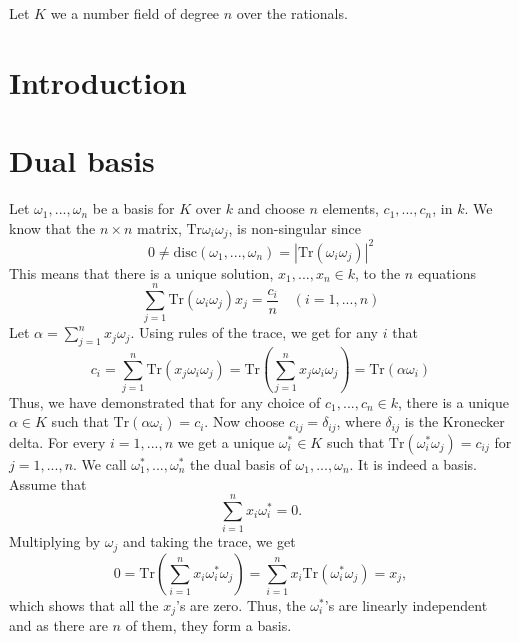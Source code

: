 \documentclass{article}
\newcommand{\tr}{\text{Tr}}
\begin{document}

\tableofcontents



Let $K$ we a number field of degree $n$ over the rationals.






\section{Introduction}

\section{Dual basis}
Let $\omega_1, ..., \omega_n$ be a basis for $K$ over $k$ and choose $n$ elements, $c_1, ..., c_n$, in $k$. We know that the $n \times n$ matrix, $\tr {\omega_i \omega_j}$, is non-singular since $$0 \neq \text{disc}(\omega_1, ..., \omega_n) = |\tr(\omega_i \omega_j)|^2$$
This means that there is a unique solution, $x_1, ..., x_n \in k$, to the $n$ equations
$$\sum_{j=1}^n \tr(\omega_i \omega_j) x_j = \frac{c_i}{n} \quad (i = 1, ..., n)$$
Let $\alpha = \sum_{j=1}^n x_j \omega_j$. Using rules of the trace, we get for any $i$ that
$$c_i = \sum_{j=1}^n \tr(x_j \omega_i \omega_j) = \tr(\sum_{j=1}^n x_j \omega_i \omega_j) = \tr(\alpha \omega_i)$$
Thus, we have demonstrated that for any choice of $c_1, ..., c_n \in k$, there is a unique $\alpha \in K$ such that $\tr(\alpha \omega_i)= c_i$. Now choose $c_{ij} = \delta_{ij}$, where $\delta_{ij}$ is the Kronecker delta. For every $i = 1, ..., n$ we get a unique $\omega_i^* \in K$ such that $\tr(\omega_i^* \omega_j) = c_{ij}$ for $j = 1, ..., n$. We call $\omega_1^*, ..., \omega_n^*$ the dual basis of $\omega_1, ..., \omega_n$. It is indeed a basis. Assume that 
$$\sum_{i=1}^n x_i \omega_i^* = 0.$$
Multiplying by $\omega_j$ and taking the trace, we get
$$0 = \tr(\sum_{i=1}^n x_i \omega_i^* \omega_j) = \sum_{i=1}^n x_i \tr(\omega_i^* \omega_j) = x_j,$$
which shows that all the $x_j$'s are zero. Thus, the $\omega_i^*$'s are linearly independent and as there are $n$ of them, they form a basis.
\end{document}
